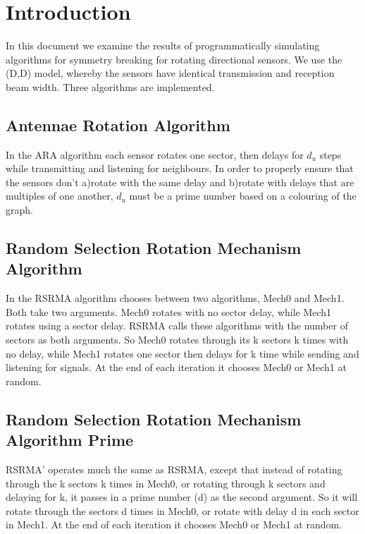 \section{Introduction}
In this document we examine the results of programmatically simulating algorithms for symmetry breaking for rotating directional sensors. We use the (D,D) model, whereby the sensors have identical transmission and reception beam width. Three algorithms are implemented.

\subsection{Antennae Rotation Algorithm}
In the ARA algorithm each sensor rotates one sector, then delays for $d_{u}$ steps while transmitting and listening for neighbours. In order to properly ensure that the sensors don't a)rotate with the same delay and b)rotate with delays that are multiples of one another, $d_{u}$ must be a prime number based on a colouring of the graph. 

\subsection{Random Selection Rotation Mechanism Algorithm}
In the RSRMA algorithm chooses between two algorithms, Mech0 and Mech1. Both take two arguments. Mech0 rotates with no sector delay, while Mech1 rotates using a sector delay. RSRMA calls these algorithms with the number of sectors as both arguments. So Mech0 rotates through its k sectors k times with no delay, while Mech1 rotates one sector then delays for k time while sending and listening for signals. At the end of each iteration it chooses Mech0 or Mech1 at random.

\subsection{Random Selection Rotation Mechanism Algorithm Prime}
RSRMA' operates much the same as RSRMA, except that instead of rotating through the k sectors k times in Mech0, or rotating through k sectors and delaying for k, it passes in a prime number (d) as the second argument. So it will rotate through the sectors d times in Mech0, or rotate with delay d in each sector in Mech1. At the end of each iteration it chooses Mech0 or Mech1 at random.
